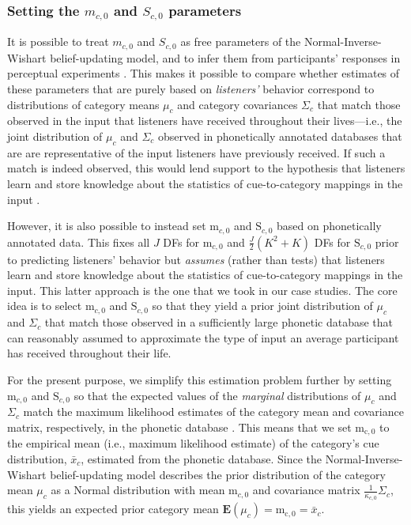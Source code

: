 \documentclass[
  11pt,
  man,floatsintext]{apa6}
\begin{document}
\subsubsection{\texorpdfstring{Setting the \(m_{c,0}\) and \(S_{c,0}\) parameters}{Setting the m\_\{c,0\} and S\_\{c,0\} parameters}}\label{setting-the-m_c0-and-s_c0-parameters}

It is possible to treat \(m_{c,0}\) and \(S_{c,0}\) as free parameters of the Normal-Inverse-Wishart belief-updating model, and to infer them from participants' responses in perceptual experiments \autocite{kleinschmidt-jaeger2016cogsci}. This makes it possible to compare whether estimates of these parameters that are purely based on \emph{listeners'} behavior correspond to distributions of category means \(\mu_c\) and category covariances \(\Sigma_c\) that match those observed in the input that listeners have received throughout their lives---i.e., the joint distribution of \(\mu_c\) and \(\Sigma_c\) observed in phonetically annotated databases that are are representative of the input listeners have previously received. If such a match is indeed observed, this would lend support to the hypothesis that listeners learn and store knowledge about the statistics of cue-to-category mappings in the input \autocites[for initial tests of this type, and further discussion, see][]{kleinschmidt-jaeger2016cogsci,tan2022}.

However, it is also possible to instead set \(\mathrm{m}_{c,0}\) and \(\mathrm{S}_{c,0}\) based on phonetically annotated data. This fixes all \(J\) DFs for \(\mathrm{m}_{c,0}\) and \(\frac{J}{2}(K^2+K)\) DFs for \(\mathrm{S}_{c,0}\) prior to predicting listeners' behavior but \emph{assumes} (rather than tests) that listeners learn and store knowledge about the statistics of cue-to-category mappings in the input. This latter approach is the one that we took in our case studies. The core idea is to select \(\mathrm{m}_{c,0}\) and \(\mathrm{S}_{c,0}\) so that they yield a prior joint distribution of \(\mu_c\) and \(\Sigma_c\) that match those observed in a sufficiently large phonetic database that can reasonably assumed to approximate the type of input an average participant has received throughout their life.

For the present purpose, we simplify this estimation problem further by setting \(\mathrm{m}_{c,0}\) and \(\mathrm{S}_{c,0}\) so that the expected values of the \emph{marginal} distributions of \(\mu_c\) and \(\Sigma_c\) match the maximum likelihood estimates of the category mean and covariance matrix, respectively, in the phonetic database \autocite{chodroff-wilson2018}. This means that we set \(\mathrm{m_{c,0}}\) to the empirical mean (i.e., maximum likelihood estimate) of the category's cue distribution, \(\bar{x}_c\), estimated from the phonetic database. Since the Normal-Inverse-Wishart belief-updating model describes the prior distribution of the category mean \(\mu_c\) as a Normal distribution with mean \(\mathrm{m}_{c,0}\) and covariance matrix \(\frac{1}{\kappa_{c,0}}\Sigma_c\), this yields an expected prior category mean \(\mathbf{E}(\mu_c) = \mathrm{m_{c,0}} = \bar{x}_c\).
\end{document}
